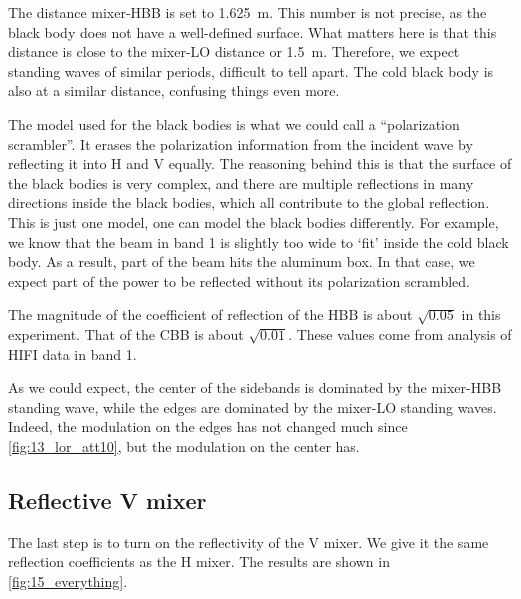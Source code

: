The distance mixer-HBB is set to \SI{1.625}{\meter}.
This number is not precise, as the black body does not have a well-defined surface.
What matters here is that this distance is close to the mixer-LO distance or \SI{1.5}{\meter}.
Therefore, we expect standing waves of similar periods, difficult to tell apart.
The cold black body is also at a similar distance, confusing things even more.

The model used for the black bodies is what we could call a ``polarization scrambler''.
It erases the polarization information from the incident wave by reflecting it into H and V equally.
The reasoning behind this is that the surface of the black bodies is very complex, and there are multiple reflections in many directions inside the black bodies, which all contribute to the global reflection.
This is just one model, one can model the black bodies differently.
For example, we know that the beam in band 1 is slightly too wide to `fit' inside the cold black body.
As a result, part of the beam hits the aluminum box.
In that case, we expect part of the power to be reflected without its polarization scrambled.

The magnitude of the coefficient of reflection of the HBB is about $\sqrt{0.05}$ in this experiment.
That of the CBB is about $\sqrt{0.01}$.
These values come from analysis of HIFI data in band 1.

As we could expect, the center of the sidebands is dominated by the mixer-HBB standing wave, while the edges are dominated by the mixer-LO standing waves.
Indeed, the modulation on the edges has not changed much since \cref{fig:13_lor_att10},
but the modulation on the center has.

\clearpage
\subsection{Reflective V mixer}
The last step is to turn on the reflectivity of the V mixer.
We give it the same reflection coefficients as the H mixer.
The results are shown in \cref{fig:15_everything}.

